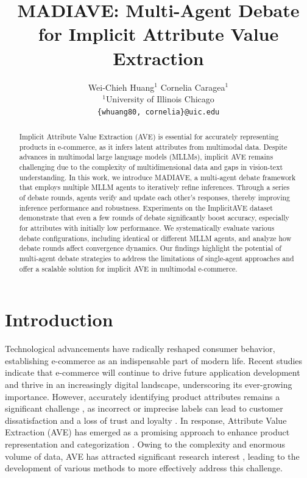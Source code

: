\documentclass[11pt]{article}
\title{MADIAVE: Multi-Agent Debate for Implicit Attribute Value Extraction}
\author{
  Wei-Chieh Huang$^1$ \quad Cornelia Caragea$^1$ \\
  $^1$University of Illinois Chicago \\
  \texttt{\{whuang80, cornelia\}@uic.edu}
}
\newcommand{\modelname}{MADIAVE}
\begin{document}
\maketitle


\begin{abstract}
Implicit Attribute Value Extraction (AVE) is essential for accurately representing products in e-commerce, as it infers latent attributes from multimodal data. Despite advances in multimodal large language models (MLLMs), implicit AVE remains challenging due to the complexity of multidimensional data and gaps in vision-text understanding. In this work, we introduce \textsc{\modelname}, a multi-agent debate framework that employs multiple MLLM agents to iteratively refine inferences. Through a series of debate rounds, agents verify and update each other's responses, thereby improving inference performance and robustness. Experiments on the ImplicitAVE dataset demonstrate that even a few rounds of debate significantly boost accuracy, especially for attributes with initially low performance. We systematically evaluate various debate configurations, including identical or different MLLM agents, and analyze how debate rounds affect convergence dynamics. Our findings highlight the potential of multi-agent debate strategies to address the limitations of single-agent approaches and offer a scalable solution for implicit AVE in multimodal e-commerce.
\end{abstract}

\section{Introduction}
\label{sec:introduction}

Technological advancements have radically reshaped consumer behavior, establishing e-commerce as an indispensable part of modern life. Recent studies \citep{mohdhar2021future} indicate that e-commerce will continue to drive future application development and thrive in an increasingly digital landscape, underscoring its ever-growing importance. However, accurately identifying product attributes remains a significant challenge \citep{zhang2024stronger}, as incorrect or imprecise labels can lead to customer dissatisfaction and a loss of trust and loyalty \citep{Lin2021Pam}. In response, Attribute Value Extraction (AVE) has emerged as a promising approach to enhance product representation and categorization \citep{Zheng:2018, Yan:2021, yang-etal-2023-mixpave}. Owing to the complexity and enormous volume of data, AVE has attracted significant research interest \citep{hu2025hypergraph, gong2025visual}, leading to the development of various methods to more effectively address this challenge.
\end{document}
